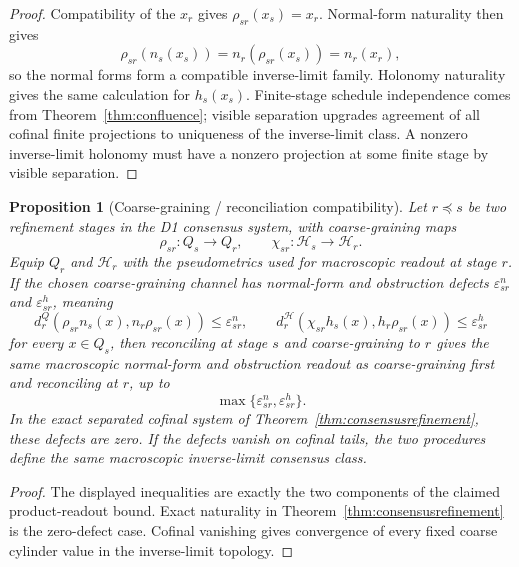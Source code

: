 \documentclass[11pt]{article}
\newtheorem{proposition}[theorem]{Proposition}
\begin{document}
\begin{proof}
Compatibility of the \(x_r\) gives \(\rho_{sr}(x_s)=x_r\). Normal-form naturality then gives
\[
\rho_{sr}(n_s(x_s))=n_r(\rho_{sr}(x_s))=n_r(x_r),
\]
so the normal forms form a compatible inverse-limit family. Holonomy naturality gives the same
calculation for \(h_s(x_s)\). Finite-stage schedule independence comes from
Theorem~\ref{thm:confluence}; visible separation upgrades agreement of all cofinal finite
projections to uniqueness of the inverse-limit class. A nonzero inverse-limit holonomy must have
a nonzero projection at some finite stage by visible separation.
\end{proof}

\begin{proposition}[Coarse-graining / reconciliation compatibility]\label{prop:consensuscoarse}
Let \(r\preceq s\) be two refinement stages in the D1 consensus system, with coarse-graining
maps
\[
\rho_{sr}:Q_s\to Q_r,\qquad \chi_{sr}:\mathcal H_s\to\mathcal H_r.
\]
Equip \(Q_r\) and \(\mathcal H_r\) with the pseudometrics used for macroscopic readout at stage
\(r\). If the chosen coarse-graining channel has normal-form and obstruction defects
\(\varepsilon^n_{sr}\) and \(\varepsilon^h_{sr}\), meaning
\[
d^Q_r(\rho_{sr}n_s(x),n_r\rho_{sr}(x))\le\varepsilon^n_{sr},
\qquad
d^{\mathcal H}_r(\chi_{sr}h_s(x),h_r\rho_{sr}(x))\le\varepsilon^h_{sr}
\]
for every \(x\in Q_s\), then reconciling at stage \(s\) and coarse-graining to \(r\) gives the
same macroscopic normal-form and obstruction readout as coarse-graining first and reconciling at
\(r\), up to
\[
\max\{\varepsilon^n_{sr},\varepsilon^h_{sr}\}.
\]
In the exact separated cofinal system of Theorem~\ref{thm:consensusrefinement}, these defects are
zero. If the defects vanish on cofinal tails, the two procedures define the same macroscopic
inverse-limit consensus class.
\end{proposition}

\begin{proof}
The displayed inequalities are exactly the two components of the claimed product-readout bound.
Exact naturality in Theorem~\ref{thm:consensusrefinement} is the zero-defect case. Cofinal
vanishing gives convergence of every fixed coarse cylinder value in the inverse-limit topology.
\end{proof}
\end{document}
